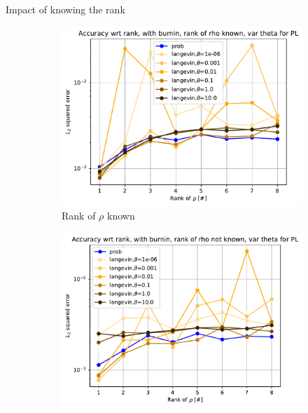 \documentclass{beamer}
\begin{document}
\begin{frame}{Impact of knowing the rank}
    \begin{figure}[H]

        \centering
    
        \begin{subfigure}[b]{0.49\textwidth}
    
    
            \centering
    
            \includegraphics[width=\textwidth]{figures/experiments/rank_info/rank_known_var_theta_pl-1.png}
    
            \caption{Rank of $\rho$ known}
    
            \label{fig:rank-info-var-theta-sub}
    
        \end{subfigure}
        \hfill
        \begin{subfigure}[b]{0.49\textwidth}
    
    
            \centering
    
            \includegraphics[width=\textwidth]{figures/experiments/rank_info/rank_not_known_var_theta_pl-1.png}
    

\end{subfigure}
\end{figure}
\end{frame}
\end{document}
